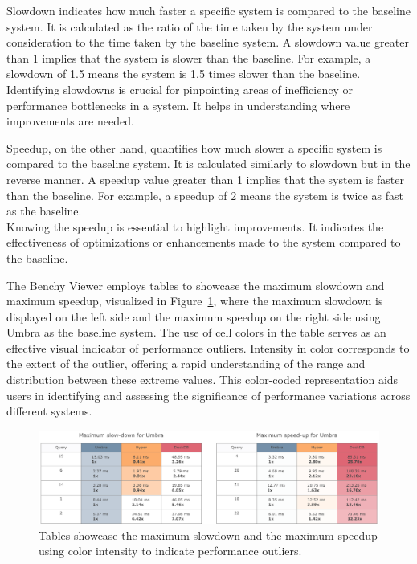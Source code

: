 Slowdown indicates how much faster a specific system is compared to the baseline system. It is calculated as the ratio of the time taken by the system under consideration to the time taken by the baseline system. A slowdown value greater than 1 implies that the system is slower than the baseline. For example, a slowdown of 1.5 means the system is 1.5 times slower than the baseline.\\
Identifying slowdowns is crucial for pinpointing areas of inefficiency or performance bottlenecks in a system. It helps in understanding where improvements are needed.

Speedup, on the other hand, quantifies how much slower a specific system is compared to the baseline system. It is calculated similarly to slowdown but in the reverse manner. A speedup value greater than 1 implies that the system is faster than the baseline. For example, a speedup of 2 means the system is twice as fast as the baseline.\\
Knowing the speedup is essential to highlight improvements. It indicates the effectiveness of optimizations or enhancements made to the system compared to the baseline.

The Benchy Viewer employs tables to showcase the maximum slowdown and maximum speedup, visualized in Figure~\ref{fig:slowdown-speedup-chart}, where the maximum slowdown is displayed on the left side and the maximum speedup on the right side using Umbra as the baseline system. The use of cell colors in the table serves as an effective visual indicator of performance outliers. Intensity in color corresponds to the extent of the outlier, offering a rapid understanding of the range and distribution between these extreme values. This color-coded representation aids users in identifying and assessing the significance of performance variations across different systems.

\begin{figure}[h]
  \centering
  \includegraphics[width=1\linewidth]{figures/bsp-table-speedup-slowdown.png}
  \caption{Tables showcase the maximum slowdown and the maximum speedup using color intensity to indicate performance outliers.}
  \label{fig:slowdown-speedup-chart}
\end{figure}

